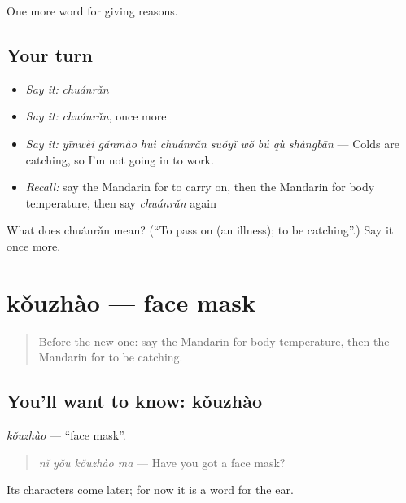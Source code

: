 \begin{grammarlens}[title={What you've built}]
One more word for giving reasons.
\end{grammarlens}

\subsection*{Your turn}
\begin{itemize}
\raggedright
  \item \emph{Say it:} \emph{chuánrǎn}
  \item \emph{Say it:} \emph{chuánrǎn}, once more
  \item \emph{Say it:} \emph{yīnwèi gǎnmào huì chuánrǎn suǒyǐ wǒ bú qù shàngbān} — Colds are catching, so I'm not going in to work.
  \item \emph{Recall:} say the Mandarin for to carry on, then the Mandarin for body temperature, then say \emph{chuánrǎn} again
\end{itemize}

\begin{tcolorbox}[breakable,colback=teal!4,colframe=teal!35!black,title={Before you move on}]
What does chuánrǎn mean? (\textquotedblleft{}To pass on (an illness); to be catching\textquotedblright{}.) Say it once more.
\end{tcolorbox}
\section[kǒuzhào]{kǒuzhào — face mask}

\label{lesson:ZH-C245-kouzhao}



\begin{quote}
Before the new one: say the Mandarin for body temperature, then the Mandarin for to be catching.
\end{quote}

\subsection*{You'll want to know: kǒuzhào}
\emph{kǒuzhào} — \textquotedblleft{}face mask\textquotedblright{}.

\begin{quote}
\emph{nǐ yǒu kǒuzhào ma} — Have you got a face mask?
\end{quote}

Its characters come later; for now it is a word for the ear.

